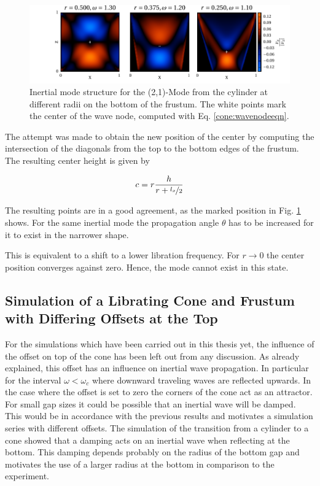 \begin{figure}[!b]
  \centering
  \includegraphics{gfx/cone/transition/phase.pdf}
  \caption{\label{fig:cone:phase}
    Inertial mode structure for the (2,1)-Mode from the cylinder at different radii on the bottom of the frustum.
    The white points mark the center of the wave node, computed with Eq.  \ref{cone:wavenodeeqn}.
  }
\end{figure}

The attempt was made to obtain the new position of the center
by computing the intersection of the diagonals from the top to the bottom edges of the frustum.
The resulting center height is given by

\begin{align}
\label{cone:wavenodeeqn}
c  = r \frac{h}{r+\nicefrac{l_x}{2}}
\end{align}

The resulting points are in a good agreement, as the marked position in Fig. \ref{fig:cone:phase} shows.
For the same inertial mode the propagation angle $\theta$ has to be
increased for it to exist in the narrower shape.

This is equivalent to a shift to a lower libration frequency.
For $r \rightarrow 0$ the center position converges against zero. Hence, the mode cannot exist in this state.

\subsection{Simulation of a Librating Cone and Frustum with Differing Offsets at the Top}

For the simulations which have been carried out in this thesis yet,
the influence of the offset on top of the cone has been left out from any discussion.
As already explained, this offset has an influence on inertial wave propagation.
In particular for the interval $\omega<\omega_c$ where  downward traveling waves are
reflected upwards.
In the case where the offset is set to zero the corners of the cone act as an attractor.
For small gap sizes it could be possible that an inertial wave will be damped.
This would be in accordance with the previous results and
motivates a simulation series with different offsets.
The simulation of the transition from a cylinder to a cone showed
that a damping acts on an inertial wave when reflecting at the bottom.
This damping depends probably on the radius of the bottom gap
and motivates the use of a larger radius at the bottom in comparison to the experiment.

